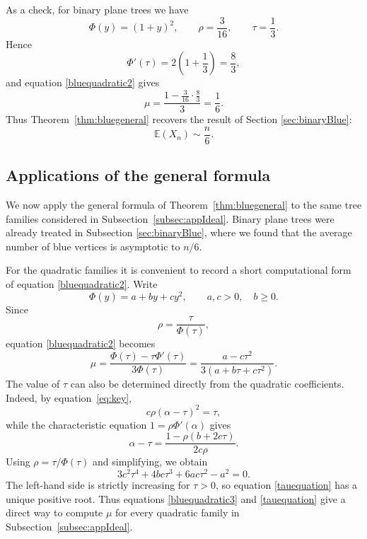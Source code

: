 \documentclass[10pt,a4paper]{amsart}
\theoremstyle{remark}
\begin{document}
As a check, for binary plane trees we have
\[
\Phi(y)=(1+y)^2,
\qquad
\rho=\frac{3}{16},
\qquad
\tau=\frac13.
\]
Hence
\[
\Phi'(\tau)=2\left(1+\frac13\right)=\frac83,
\]
and equation \eqref{bluequadratic2} gives
\[
\mu
=
\frac{1-\frac{3}{16}\cdot\frac83}{3}
=
\frac16.
\]
Thus Theorem~\ref{thm:bluegeneral} recovers the result of Section \ref{sec:binaryBlue}:
\[
\mathbb E(X_n)\sim\frac{n}{6}.
\]


\subsection{Applications of the general formula}

We now apply the general formula of Theorem~\ref{thm:bluegeneral} to the
same tree families considered in Subsection~\ref{subsec:appIdeal}.  Binary plane trees were
already treated in Subsection \ref{sec:binaryBlue}, where we found that the average number of
blue vertices is asymptotic to $n/6$.

For the quadratic families it is convenient to record a short computational
form of equation \eqref{bluequadratic2}.  Write
\[
\Phi(y)=a+by+cy^2,
\qquad a,c>0,\quad b\geq 0.
\]
Since
\[
\rho=\frac{\tau}{\Phi(\tau)},
\]
equation \eqref{bluequadratic2} becomes
\begin{equation}\label{bluequadratic3}
\mu
=
\frac{\Phi(\tau)-\tau\Phi'(\tau)}{3\Phi(\tau)}
=
\frac{a-c\tau^2}{3(a+b\tau+c\tau^2)}.
\end{equation}
The value of $\tau$ can also be determined directly from the quadratic
coefficients.  Indeed, by equation~\eqref{eq:key},
\[
c\rho(\alpha-\tau)^2=\tau,
\]
while the characteristic equation $1=\rho\Phi'(\alpha)$ gives
\[
\alpha-\tau
=
\frac{1-\rho(b+2c\tau)}{2c\rho}.
\]
Using $\rho=\tau/\Phi(\tau)$ and simplifying, we obtain
\begin{equation}\label{tauequation}
3c^2\tau^4+4bc\tau^3+6ac\tau^2-a^2=0.
\end{equation}
The left-hand side is strictly increasing for $\tau>0$, so
equation \eqref{tauequation} has a unique positive root.  Thus
equations \eqref{bluequadratic3} and \eqref{tauequation} give a direct way to compute
$\mu$ for every quadratic family in Subsection~\ref{subsec:appIdeal}.
\end{document}
